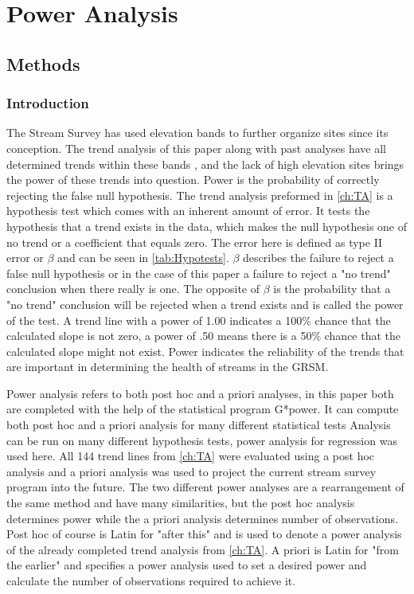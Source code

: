 \chapter{Power Analysis} \label{ch:poweranslysis}

\section{Methods}

\subsection{Introduction}

The Stream Survey has used elevation bands to further organize sites since its conception.
The trend analysis of this paper along with past analyses have all determined trends within these bands , and the lack of high elevation sites brings the power of these trends into question.
Power is the probability of correctly rejecting the false null hypothesis.
The trend analysis  preformed in \autoref{ch:TA} is a hypothesis test which comes with an inherent amount of error.  
It tests the hypothesis that a trend exists in the data, which makes the null hypothesis one of no trend or a coefficient that equals zero.
The error here is defined as type II error or $\beta$ and can be seen in \autoref{tab:Hypotests}.
$\beta$ describes the failure to reject a false null hypothesis or in the case of this paper a failure to reject a "no trend" conclusion when there really is one.
The opposite of $\beta$ is the probability that a "no trend" conclusion will be rejected when a trend exists and is called the power of the test.
A trend line with a power of 1.00 indicates a 100$\%$ chance that the calculated slope is not zero, a power of .50 means there is a 50$\%$ chance that the calculated slope might not exist.
Power indicates the reliability of the trends that are important in determining the health of streams in the GRSM.



Power analysis refers to both  post hoc and a priori analyses, in this paper both are completed with the help of the statistical program G*power.
It can compute both post hoc and a priori analysis for many different statistical tests \citep{faul2009statistical}
Analysis can be run on many different hypothesis tests, power analysis for regression was used here.
All 144 trend lines from \autoref{ch:TA} were evaluated using a post hoc analysis and a priori analysis was used to project the current stream survey program into the future.
The two different power analyses are a rearrangement of the same method and have many similarities, but the post hoc analysis determines power while the a priori analysis determines number of observations.
Post hoc of course is Latin for "after this" and is used to denote a power analysis of the already completed trend analysis from \autoref{ch:TA}.
A priori is Latin for "from the earlier" and specifies a power analysis used to set a desired power and calculate the number of observations required to achieve it.


